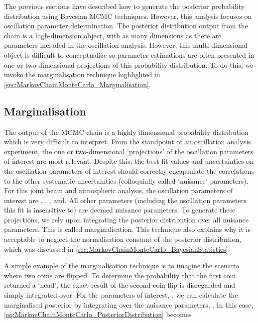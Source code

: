 The previous sections have described how to generate the posterior probability distribution using Bayesian MCMC techniques. However, this analysis focuses on oscillation parameter determination. The posterior distribution output from the chain is a high-dimension object, with as many dimensions as there are parameters included in the oscillation analysis. However, this multi-dimensional object is difficult to conceptualize so parameter estimations are often presented in one or two-dimensional projections of this probability distribution. To do this, we invoke the marginalisation technique highlighted in \autoref{sec:MarkovChainMonteCarlo_Marginalisation}.

\subsection{Marginalisation}
\label{sec:MarkovChainMonteCarlo_Marginalisation}

The output of the MCMC chain is a highly dimensional probability distribution which is very difficult to interpret. From the standpoint of an oscillation analysis experiment, the one or two-dimensional `projections' of the oscillation parameters of interest are most relevant. Despite this, the best fit values and uncertainties on the oscillation parameters of interest should correctly encapsulate the correlations to the other systematic uncertainties (colloquially called `nuisance' parameters). For this joint beam and atmospheric analysis, the oscillation parameters of interest are , , , and. All other parameters (including the oscillation parameters this fit is insensitive to) are deemed nuisance parameters. To generate these projections, we rely upon integrating the posterior distribution over all nuisance parameters. This is called marginalisation. This technique also explains why it is acceptable to neglect the normalisation constant of the posterior distribution, which was discussed in \autoref{sec:MarkovChainMonteCarlo_BayesianStatistics}.

A simple example of the marginalisation technique is to imagine the scenario where two coins are flipped. To determine the probability that the first coin returned a `head', the exact result of the second coin flip is disregarded and simply integrated over. For the parameters of interest, , we can calculate the marginalised posterior by integrating over the nuisance parameters, . In this case, \autoref{eq:MarkovChainMonteCarlo_PosteriorDistribution} becomes

